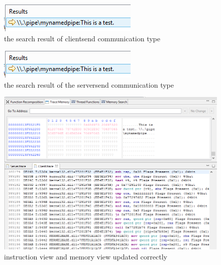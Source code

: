 \begin{figure}[H]
\includegraphics{Figures/occclientresult}
 \caption{the search result of clientsend communication type}
\label{occclientresult}
\end{figure}


\begin{figure}[H]
\includegraphics{Figures/occclientresult}
 \caption{the search result of the serversend communication type}
\label{occclientresult}
\end{figure}

\begin{figure}[H]
\includegraphics[scale=.66]{Figures/send}
 \caption{instruction view and memory view updated correctly}
\label{send}
\end{figure}
